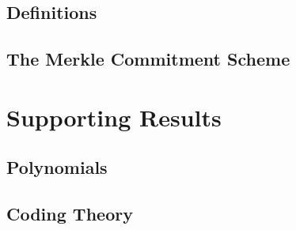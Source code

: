 \section{Definitions}

\section{The Merkle Commitment Scheme}


\chapter{Supporting Results}

\section{Polynomials}

\begin{definition}
    \label{def:multilinear_extension}
\end{definition}

\begin{theorem}
    \label{thm:multilinear_extension_unique}
\end{theorem}

\section{Coding Theory}

\begin{definition}
    \label{def:code_distance}
\end{definition}

\begin{definition}
    \label{def:distance_from_code}
\end{definition}

\begin{definition}
    \label{def:generator_matrix}
\end{definition}

\begin{definition}
    \label{def:parity_check_matrix}
\end{definition}

\begin{definition}
    \label{def:interleaved_code}
\end{definition}

